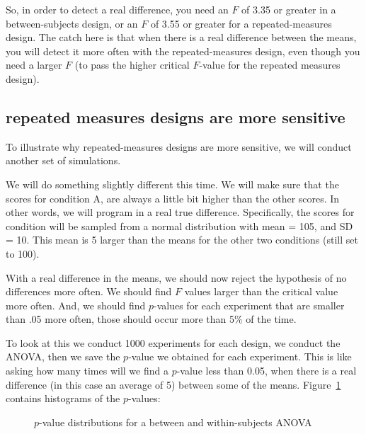 \documentclass[
  letterpaper,
  DIV=11,
  numbers=noendperiod]{scrreprt}
\begin{document}
So, in order to detect a real difference, you need an \(F\) of 3.35 or
greater in a between-subjects design, or an \(F\) of 3.55 or greater for
a repeated-measures design. The catch here is that when there is a real
difference between the means, you will detect it more often with the
repeated-measures design, even though you need a larger \(F\) (to pass
the higher critical \(F\)-value for the repeated measures design).

\subsection{repeated measures designs are more
sensitive}\label{repeated-measures-designs-are-more-sensitive}

To illustrate why repeated-measures designs are more sensitive, we will
conduct another set of simulations.

We will do something slightly different this time. We will make sure
that the scores for condition A, are always a little bit higher than the
other scores. In other words, we will program in a real true difference.
Specifically, the scores for condition will be sampled from a normal
distribution with mean = 105, and SD = 10. This mean is 5 larger than
the means for the other two conditions (still set to 100).

With a real difference in the means, we should now reject the hypothesis
of no differences more often. We should find \(F\) values larger than
the critical value more often. And, we should find \(p\)-values for each
experiment that are smaller than .05 more often, those should occur more
than 5\% of the time.

To look at this we conduct 1000 experiments for each design, we conduct
the ANOVA, then we save the \(p\)-value we obtained for each experiment.
This is like asking how many times will we find a \(p\)-value less than
0.05, when there is a real difference (in this case an average of 5)
between some of the means. Figure~\ref{fig-9fpvaluedist} contains
histograms of the \(p\)-values:

\begin{figure}


\caption{\label{fig-9fpvaluedist}\(p\)-value distributions for a between
and within-subjects ANOVA}

\end{figure}%
\end{document}
